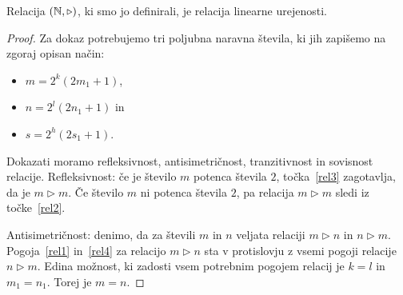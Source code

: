 \documentclass[../TG_magistrsko_delo_sections.tex]{subfiles}
\begin{document}
\begin{trditev}
Relacija $(\mathbb N, \triangleright)$, ki smo jo definirali, je relacija linearne urejenosti.
\end{trditev}
\begin{proof}
Za dokaz potrebujemo tri poljubna naravna števila, ki jih zapišemo na zgoraj opisan način:
\begin{itemize}
\item $m= 2^k(2m_1 +1)$,
\item $n= 2^l(2n_1 +1)$ in
\item $s=2^h(2s_1+1)$.
\end{itemize}
Dokazati moramo refleksivnost, antisimetričnost, tranzitivnost in sovisnost relacije.
Refleksivnost: če je število $m$ potenca števila $2$, točka~\ref{rel3} zagotavlja, da je $m \triangleright m$. Če število $m$ ni potenca števila $2$, pa relacija $m \triangleright m$ sledi iz točke~\ref{rel2}.

Antisimetričnost: denimo, da za števili $m$ in $n$ veljata relaciji $m \triangleright n$ in $n \triangleright m$. Pogoja~\ref{rel1} in~\ref{rel4} za relacijo $m \triangleright n$ sta v protislovju z vsemi pogoji relacije $n \triangleright m$. Edina možnost, ki zadosti vsem potrebnim pogojem relacij je $k=l$ in $m_1 = n_1$. Torej je $m=n$.


\end{proof}
\end{document}
